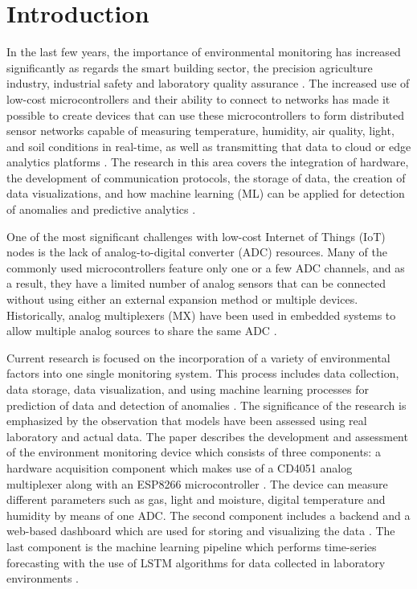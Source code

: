 ﻿\documentclass[journal]{IEEEtran}
\begin{document}
\section{Introduction}

In the last few years, the importance of environmental monitoring has
increased significantly as regards the smart building sector, the precision
agriculture industry, industrial safety and laboratory quality assurance
\cite{ref1}. The increased use of low-cost microcontrollers and their ability
to connect to networks has made it possible to create devices that can use
these microcontrollers to form distributed sensor networks capable of
measuring temperature, humidity, air quality, light, and soil conditions in
real-time, as well as transmitting that data to cloud or edge analytics
platforms \cite{ref2}. The research in this area covers the integration of
hardware, the development of communication protocols, the storage of data,
the creation of data visualizations, and how machine learning (ML) can be
applied for detection of anomalies and predictive analytics \cite{ref3}.

One of the most significant challenges with low-cost Internet of Things
(IoT) nodes \cite{ref4} is the lack of analog-to-digital converter (ADC)
resources. Many of the commonly used microcontrollers feature only one or a
few ADC channels, and as a result, they have a limited number of analog
sensors that can be connected without using either an external expansion
method or multiple devices. Historically, analog multiplexers (MX) have been
used in embedded systems to allow multiple analog sources to share the same
ADC \cite{ref5}.

Current research is focused on the incorporation of a variety of
environmental factors into one single monitoring system. This process
includes data collection, data storage, data visualization, and using
machine learning processes for prediction of data and detection of
anomalies \cite{ref6}. The significance of the research is emphasized by
the observation that models have been assessed using real laboratory and
actual data. The paper describes the development and assessment of the
environment monitoring device which consists of three components: a
hardware acquisition component which makes use of a CD4051 analog
multiplexer along with an ESP8266 microcontroller \cite{ref7}. The device
can measure different parameters such as gas, light and moisture, digital
temperature and humidity by means of one ADC. The second component includes
a backend and a web-based dashboard which are used for storing and
visualizing the data \cite{ref8}. The last component is the machine
learning pipeline which performs time-series forecasting with the use of
LSTM algorithms for data collected in laboratory environments \cite{ref9}.
\end{document}
